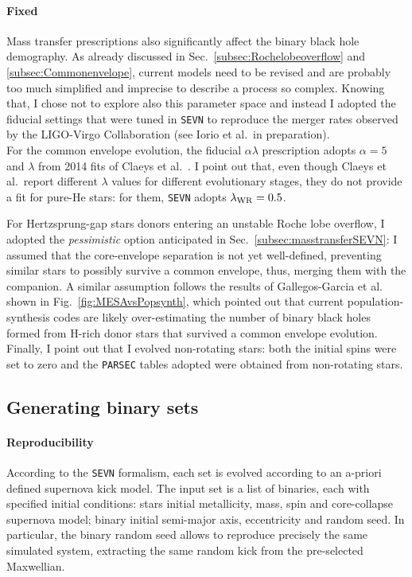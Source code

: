 \documentclass[a4paper,titlepage]{book}     	%
\begin{document}
\paragraph{Fixed}
Mass transfer prescriptions also significantly affect the binary black hole demography. As already discussed in Sec.\ \ref{subsec:Rochelobeoverflow} and \ref{subsec:Commonenvelope}, current models need to be revised and are probably too much simplified and imprecise to describe a process so complex. Knowing that, I chose not to explore also this parameter space and instead I adopted the fiducial settings that were tuned in \texttt{SEVN} to reproduce the merger rates observed by the LIGO-Virgo Collaboration (see Iorio et al.\ in preparation). \\

For the common envelope evolution, the fiducial $\alpha \lambda$ prescription adopts $\alpha=5$ and $\lambda$ from 2014 fits of Claeys et al.\ \cite{Clayes2014_lambdaCE}. I point out that, even though Claeys et al.\ report different $\lambda$ values for different evolutionary stages, they do not provide a fit for pure-He stars: for them, \texttt{SEVN} adopts $\lambda_{\rm WR} = 0.5$.

For Hertzsprung-gap stars donors entering an unstable Roche lobe overflow, I adopted the \emph{pessimistic} option anticipated in Sec.\ \ref{subsec:masstransferSEVN}: I assumed that the core-envelope separation is not yet well-defined, preventing similar stars to possibly survive a common envelope, thus, merging them with the companion. A similar assumption follows the results of Gallegos-Garcia et al.\ \cite{gallegos2021MESAvspopsynth} shown in Fig.\ \ref{fig:MESAvsPopsynth}, which pointed out that current population-synthesis codes are likely over-estimating the number of binary black holes formed from H-rich donor stars that survived a common envelope evolution.\\

Finally, I point out that I evolved non-rotating stars: both the initial spins were set to zero and the \texttt{PARSEC} tables adopted were obtained from non-rotating stars.



\subsection{Generating binary sets}\label{subsec:setgeneration}
\paragraph{Reproducibility} According to the \texttt{SEVN} formalism, each set is evolved according to an a-priori defined supernova kick model. The input set is a list of binaries, each with specified initial conditions: stars initial metallicity, mass, spin and core-collapse supernova model; binary initial semi-major axis, eccentricity and random seed. In particular, the binary random seed allows to reproduce precisely the same simulated system, extracting the same random kick from the pre-selected Maxwellian. 
\end{document}

